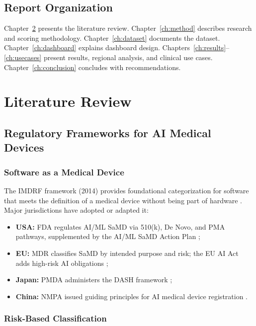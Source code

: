 \documentclass[12pt,a4paper]{report}
\begin{document}
\section{Report Organization}

Chapter~\ref{ch:litreview} presents the literature review. Chapter~\ref{ch:method} describes research and scoring methodology. Chapter~\ref{ch:dataset} documents the dataset. Chapter~\ref{ch:dashboard} explains dashboard design. Chapters~\ref{ch:results}--\ref{ch:usecases} present results, regional analysis, and clinical use cases. Chapter~\ref{ch:conclusion} concludes with recommendations.

\chapter{Literature Review}
\label{ch:litreview}

\section{Regulatory Frameworks for AI Medical Devices}

\subsection{Software as a Medical Device}

The IMDRF framework (2014) provides foundational categorization for software that meets the definition of a medical device without being part of hardware \cite{imdrf2014}. Major jurisdictions have adopted or adapted it:
\begin{itemize}[noitemsep]
  \item \textbf{USA:} FDA regulates AI/ML SaMD via 510(k), De Novo, and PMA pathways, supplemented by the AI/ML SaMD Action Plan \cite{fda2021};
  \item \textbf{EU:} MDR classifies SaMD by intended purpose and risk; the EU AI Act adds high-risk AI obligations \cite{euaiact2024};
  \item \textbf{Japan:} PMDA administers the DASH framework \cite{pmda2020};
  \item \textbf{China:} NMPA issued guiding principles for AI medical device registration \cite{nmpa2021}.
\end{itemize}

\subsection{Risk-Based Classification}
\end{document}

